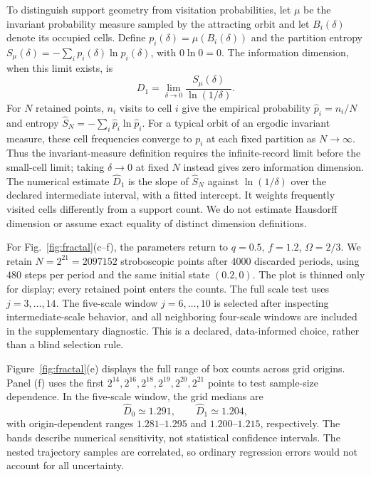 \documentclass[aps,prb,reprint,floatfix]{revtex4-2}
\begin{document}
To distinguish support geometry from visitation probabilities, let $\mu$ be the invariant probability measure sampled by the attracting orbit and let $B_i(\delta)$ denote its occupied cells. Define $p_i(\delta)=\mu(B_i(\delta))$ and the partition entropy $S_\mu(\delta)=-\sum_i p_i(\delta)\ln p_i(\delta)$, with $0\ln0=0$. The information dimension, when this limit exists, is\cite{HentschelProcaccia1983}
\begin{equation}
D_1=\lim_{\delta\to0}\frac{S_\mu(\delta)}{\ln(1/\delta)}.
\label{eq:information_dimension}
\end{equation}
For $N$ retained points, $n_i$ visits to cell $i$ give the empirical probability $\widehat p_i=n_i/N$ and entropy $\widehat S_N=-\sum_i\widehat p_i\ln\widehat p_i$. For a typical orbit of an ergodic invariant measure, these cell frequencies converge to $p_i$ at each fixed partition as $N\to\infty$. Thus the invariant-measure definition requires the infinite-record limit before the small-cell limit; taking $\delta\to0$ at fixed $N$ instead gives zero information dimension. The numerical estimate $\widehat D_1$ is the slope of $\widehat S_N$ against $\ln(1/\delta)$ over the declared intermediate interval, with a fitted intercept. It weights frequently visited cells differently from a support count. We do not estimate Hausdorff dimension or assume exact equality of distinct dimension definitions.

For Fig.~\ref{fig:fractal}(c--f), the parameters return to $q=0.5$, $f=1.2$, $\Omega=2/3$. We retain $N=2^{21}=2097152$ stroboscopic points after $4000$ discarded periods, using $480$ steps per period and the same initial state $(0.2,0)$. The plot is thinned only for display; every retained point enters the counts. The full scale test uses $j=3,\ldots,14$. The five-scale window $j=6,\ldots,10$ is selected after inspecting intermediate-scale behavior, and all neighboring four-scale windows are included in the supplementary diagnostic. This is a declared, data-informed choice, rather than a blind selection rule.

Figure~\ref{fig:fractal}(e) displays the full range of box counts across grid origins. Panel (f) uses the first $2^{14},2^{16},2^{18},2^{19},2^{20},2^{21}$ points to test sample-size dependence. In the five-scale window, the grid medians are
\begin{equation}
\widehat D_0\simeq1.291,\qquad\widehat D_1\simeq1.204,
\label{eq:measured_dimensions}
\end{equation}
with origin-dependent ranges $1.281$--$1.295$ and $1.200$--$1.215$, respectively. The bands describe numerical sensitivity, not statistical confidence intervals. The nested trajectory samples are correlated, so ordinary regression errors would not account for all uncertainty.
\end{document}
